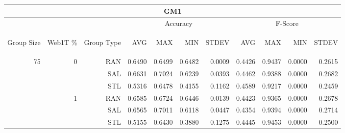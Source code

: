 \begin{center}
\begin{table}[htbp]
\begin{tabular}{ | r | r | r | r | r | r | r | r | r | r | r |}
\hline
\multicolumn{11}{|c|}{GM1}\\
\hline
 & & & \multicolumn{4}{|c|}{Accuracy} & \multicolumn{4}{|c|}{F-Score}\\ \cline{4-11}
\begin{sideways}Group Size\end{sideways} & \begin{sideways}Web1T \%\end{sideways} & \begin{sideways}Group Type\end{sideways} & \begin{sideways}AVG\end{sideways} & \begin{sideways}MAX\end{sideways} & \begin{sideways}MIN\end{sideways} & \begin{sideways}STDEV\end{sideways} & \begin{sideways}AVG\end{sideways} & \begin{sideways}MAX\end{sideways} & \begin{sideways}MIN\end{sideways} & \begin{sideways}STDEV\end{sideways}\\
\hline
\multirow{18}{*}{75}
 & \multirow{3}{*}{0} & RAN & 0.6490 & 0.6499 & 0.6482 & 0.0009 & 0.4426 & 0.9437 & 0.0000 & 0.2615\\ \cline{3-11}
 &   & SAL & 0.6631 & 0.7024 & 0.6239 & 0.0393 & 0.4462 & 0.9388 & 0.0000 & 0.2682\\ \cline{3-11}
 &   & STL & 0.5316 & 0.6478 & 0.4155 & 0.1162 & 0.4589 & 0.9217 & 0.0000 & 0.2459\\ \cline{2-11}
 & \multirow{3}{*}{1} & RAN & 0.6585 & 0.6724 & 0.6446 & 0.0139 & 0.4423 & 0.9365 & 0.0000 & 0.2678\\ \cline{3-11}
 &   & SAL & 0.6565 & 0.7011 & 0.6118 & 0.0447 & 0.4354 & 0.9394 & 0.0000 & 0.2714\\ \cline{3-11}
 &   & STL & 0.5155 & 0.6430 & 0.3880 & 0.1275 & 0.4445 & 0.9453 & 0.0000 & 0.2500\\ \cline{2-11}

\end{tabular}
\end{table}
\end{center}
